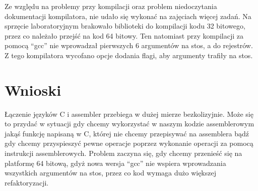 Ze względu na problemy przy kompilacji oraz problem niedoczytania dokumentacji kompilatora, nie udało się wykonać na zajęciach więcej zadań. Na sprzęcie laboratoryjnym brakowało biblioteki do kompilacji kodu 32 bitowego, przez co należało przejść na kod 64 bitowy. Ten natomiast przy kompilacji za pomocą "`gcc"' nie wprowadzał pierwszych 6 argumentów na stos, a do rejestrów. Z tego kompilatora wycofano opcje dodania flagi, aby argumenty trafiły na stos.

\section{Wnioski}
Łączenie języków C i assembler przebiega w dużej mierze bezkolizyjnie. Może się to przydać w sytuacji gdy chcemy wykorzystać w naszym kodzie assemblerowym jakąś funkcję napisaną w C, której nie chcemy przepisywać na assemblera bądź gdy chcemy przyspieszyć pewne operacje poprzez wykonanie operacji za pomocą instrukcji assemblerowych. Problem zaczyna się, gdy chcemy przenieść się na platformę 64 bitową, gdyż nowa wersja "`gcc"' nie wspiera wprowadzania wszystkich argumentów na stos, przez co kod wymaga dużo większej refaktoryzacji.